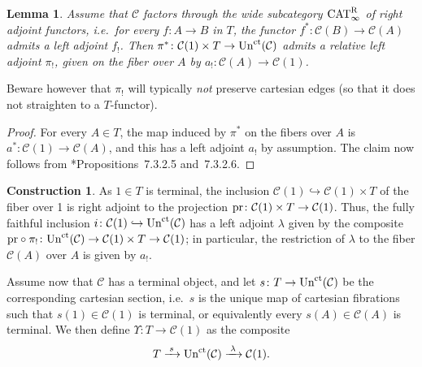 \documentclass[reqno]{memo-l}
\theoremstyle{mythm}
\newtheorem{lemma}[thm]{Lemma}
\theoremstyle{definition}
\newtheorem{constr}[thm]{Construction}
\numberwithin{equation}{section}
\newcommand{\Cc}{{\mathcal{C}}}
\DeclareMathOperator{\CAT}{CAT}
\newcommand{\pr}{\textup{pr}}
\newcommand{\ct}{\textup{ct}}
\newcommand{\Un}{\textup{Un}}
\begin{document}
\begin{lemma}\label{lemma:pi!-rel-la}
    Assume that $\Cc$ factors through the wide subcategory $\CAT^\textup{R}_\infty$ of right adjoint functors, i.e.\ for every $f\colon A\to B$ in $T$, the functor $f^*\colon\Cc(B)\to\Cc(A)$ admits a left adjoint $f_!$. Then $\pi^*\colon \Cc(1)\times T\to\Un^\ct(\Cc)$ admits a relative left adjoint $\pi_!$, given on the fiber over $A$ by $a_!\colon\Cc(A)\to\Cc(1)$.
\end{lemma}

Beware however that $\pi_!$ will typically \emph{not} preserve cartesian edges (so that it does not straighten to a $T$-functor).

\begin{proof}
    For every $A\in T$, the map induced by $\pi^*$ on the fibers over $A$ is $a^*\colon\Cc(1)\to\Cc(A)$, and this has a left adjoint $a_!$ by assumption. The claim now follows from \cite{HA}*{Propositions~7.3.2.5 and~7.3.2.6}.
\end{proof}

\begin{constr}\label{constr:Upsilon}
    As $1\in T$ is terminal, the inclusion $\Cc(1)\hookrightarrow\Cc(1)\times T$ of the fiber over 1 is right adjoint to the projection $\pr\colon\Cc(1)\times T\to\Cc(1)$. Thus, the fully faithful inclusion $i\colon\Cc(1)\hookrightarrow\Un^\ct(\Cc)$ has a left adjoint $\lambda$ given by the composite $\pr\circ\pi_!\colon
        \Un^\ct(\Cc)\to\Cc(1)\times T\to\Cc(1)$;
    in particular, the restriction of $\lambda$ to the fiber $\Cc(A)$ over $A$ is given by $a_!$.

    Assume now that $\Cc$ has a terminal object, and let $s\colon T\to\Un^\ct(\Cc)$ be the corresponding cartesian section, i.e.~$s$ is the unique map of cartesian fibrations such that $s(1)\in\Cc(1)$ is terminal, or equivalently every $s(A)\in\Cc(A)$ is terminal. We then define $\Upsilon\colon T\to\Cc(1)$ as the composite
    \[
        T\xrightarrow{\;s\;}\Un^\ct(\Cc)\xrightarrow{\;\lambda\;}\Cc(1).
    \] 
\end{constr}
\end{document}

